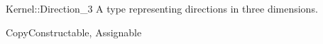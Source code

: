 \begin{ccRefConcept}{Kernel::Direction_3}
A type representing directions in three dimensions.

\ccRefines
CopyConstructable, Assignable 

\ccSeeAlso
{} \\
 \\
  \\
 \\

\end{ccRefConcept}
